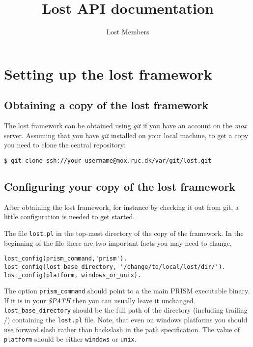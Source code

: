\documentclass{book}
\title{Lost API documentation}
\author{Lost Members}
\begin{document}
\maketitle


\tableofcontents
%

\chapter{Setting up the lost framework}

\section{Obtaining a copy of the lost framework}

The lost framework can be obtained using \emph{git} if you have an account on the
\emph{mox} server. Assuming that you have \emph{git} installed on your
local machine, to get a copy you need to clone the central repository:
\begin{verbatim}
$ git clone ssh://your-username@mox.ruc.dk/var/git/lost.git
\end{verbatim}

\section{Configuring your copy of the lost framework}

After obtaining the lost framework, for instance by checking it out
from git, a little configuration is needed to get started.

The file \texttt{lost.pl} in the top-most directory of the copy
of the framework. In the beginning of the file there are two 
important facts you may need to change,
\begin{verbatim}
lost_config(prism_command,'prism').
lost_config(lost_base_directory, '/change/to/local/lost/dir/').
lost_config(platform, windows_or_unix).
\end{verbatim}

The option \texttt{prism\_command} should point to a the main PRISM executable
binary. If it is in your  \emph{\$PATH} then you can usually leave it unchanged.\\
\texttt{lost\_base\_directory} should be the full path of the
directory (including trailing /) containing the \texttt{lost.pl}
file.  Note, that even on windows platforms you should use forward
slash rather than backslash in the path specification. The value of
\texttt{platform} should be either \texttt{windows} or \texttt{unix}. 
\end{document}
